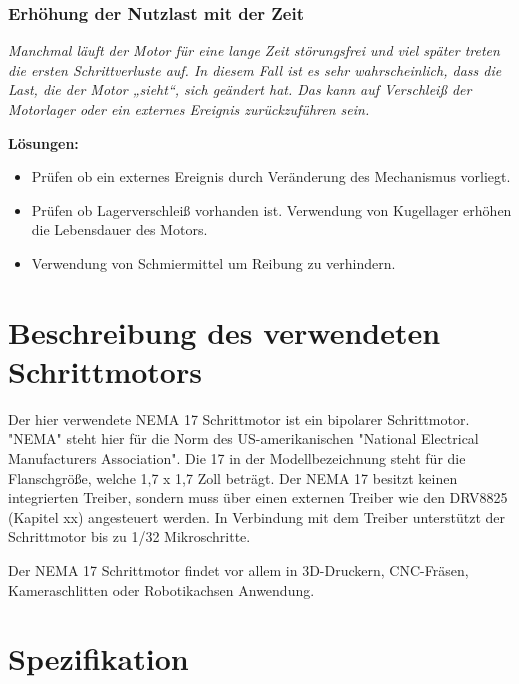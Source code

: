 {{{\subsubsection{Erhöhung der Nutzlast mit der Zeit}
				\textit{\glqq Manchmal läuft der Motor für eine lange Zeit störungsfrei und viel später treten die ersten Schrittverluste auf. In diesem Fall ist es sehr wahrscheinlich, dass die Last, die der Motor „sieht“, sich geändert hat. Das kann auf Verschleiß der Motorlager oder ein externes Ereignis zurückzuführen sein.\grqq}\cite{FaulhaberDriveSystems.2020}
				
\textbf{Lösungen:}
	\begin{itemize}
					\item Prüfen ob ein externes Ereignis durch Veränderung des Mechanismus vorliegt.
					\item Prüfen ob Lagerverschleiß vorhanden ist. Verwendung von Kugellager erhöhen die Lebensdauer des Motors.
					\item Verwendung von Schmiermittel um Reibung zu verhindern.
	\end{itemize}


\section{Beschreibung des verwendeten Schrittmotors}

Der hier verwendete NEMA 17 Schrittmotor ist ein bipolarer Schrittmotor. "NEMA" steht hier für die Norm des US-amerikanischen "National Electrical Manufacturers Association". Die 17 in der Modellbezeichnung steht für die Flanschgröße, welche 1,7 x 1,7 Zoll beträgt. Der NEMA 17 besitzt keinen integrierten Treiber, sondern muss über einen externen Treiber wie den DRV8825 (Kapitel xx) angesteuert werden. In Verbindung mit dem Treiber unterstützt der Schrittmotor bis zu 1/32 Mikroschritte. 

Der NEMA 17 Schrittmotor findet vor allem in 3D-Druckern, CNC-Fräsen, Kameraschlitten oder Robotikachsen Anwendung. 

%	

\section{Spezifikation}

}}}
